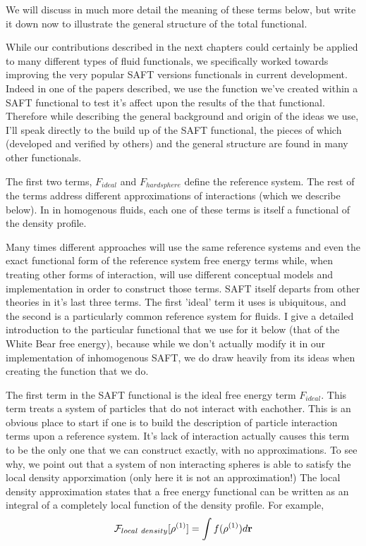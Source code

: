 We will discuss in much more detail the meaning of these terms below,
but write it down now to illustrate the general structure of the total
functional.


While our contributions described in the next chapters could certainly
be applied to many different types of fluid functionals, we
specifically worked towards improving the very popular SAFT versions
functionals in current development.  Indeed in one of the papers
described, we use the function we've created within a SAFT functional
to test it's affect upon the results of the that functional.
Therefore while describing the general background and origin of the
ideas we use, I'll speak directly to the build up of the SAFT
functional, the pieces of which (developed and verified by others) and
the general structure are found in many other functionals.


The first two terms, $F_{ideal}$ and $F_{hard sphere}$
define the reference system.  The rest of the terms address different
approximations of interactions (which we describe below).  In in
homogenous fluids, each one of these terms is itself a functional of
the density profile.

Many times different approaches will use the same reference systems
and even the exact functional form of the reference system free energy
terms while, when treating other forms of interaction, will use
different conceptual models and implementation in order to construct
those terms.  SAFT itself departs from other theories in it's last
three terms.  The first 'ideal' term it uses is ubiquitous, and the
second is a particularly common reference system for fluids.  I give a
detailed introduction to the particular functional that we use for it
below (that of the White Bear free energy), because while we don't
actually modify it in our implementation of inhomogenous SAFT, we do
draw heavily from its ideas when creating the function that we do.

The first term in the SAFT functional is the ideal free energy term
$F_{ideal}$.  This term treats a system of particles that do not
interact with eachother.  This is an obvious place to start if one is
to build the description of particle interaction terms upon a
reference system.  It's lack of interaction actually causes this term
to be the only one that we can construct exactly, with no
approximations.  To see why, we point out that a system of non
interacting spheres is able to satisfy the local density apporximation
(only here it is not an approximation!)  The local density
approximation states that a free energy functional can be written as
an integral of a completely local function of the density profile.
For example,
\begin{align}
  \mathcal{F}_{local~density}[\rho^{(1)}] = \int f(\rho^{(1)}) d\textbf{r}
\end{align}

